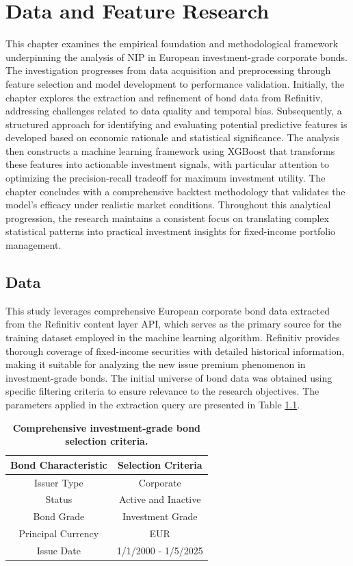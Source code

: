 \chapter{Data and Feature Research}
\label{ch:Data and Feature Research}

This chapter examines the empirical foundation and methodological framework underpinning the analysis of NIP in European investment-grade corporate bonds. The investigation progresses from data acquisition and preprocessing through feature selection and model development to performance validation. Initially, the chapter explores the extraction and refinement of bond data from Refinitiv, addressing challenges related to data quality and temporal bias. Subsequently, a structured approach for identifying and evaluating potential predictive features is developed based on economic rationale and statistical significance. The analysis then constructs a machine learning framework using XGBoost that transforms these features into actionable investment signals, with particular attention to optimizing the precision-recall tradeoff for maximum investment utility. The chapter concludes with a comprehensive backtest methodology that validates the model's efficacy under realistic market conditions. Throughout this analytical progression, the research maintains a consistent focus on translating complex statistical patterns into practical investment insights for fixed-income portfolio management.

\section{Data}
\label{sec:Data}

This study leverages comprehensive European corporate bond data extracted from the Refinitiv content layer API, which serves as the primary source for the training dataset employed in the machine learning algorithm. Refinitiv provides thorough coverage of fixed-income securities with detailed historical information, making it suitable for analyzing the new issue premium phenomenon in investment-grade bonds. The initial universe of bond data was obtained using specific filtering criteria to ensure relevance to the research objectives. The parameters applied in the extraction query are presented in Table \ref{tab:filter_criteria}.

\begin{table}[h]
    \centering
    \small
    \begin{tabular}{cc}\toprule
         \textbf{Bond Characteristic}& \textbf{Selection Criteria}\\\midrule
         Issuer Type& Corporate\\
         Status& Active and Inactive\\
         Bond Grade& Investment Grade\\
         Principal Currency& EUR\\
         Issue Date& 1/1/2000 - 1/5/2025\\ \bottomrule
    \end{tabular}
    \caption{\textbf{Comprehensive investment-grade bond selection criteria.}}
    \label{tab:filter_criteria}
\end{table}

